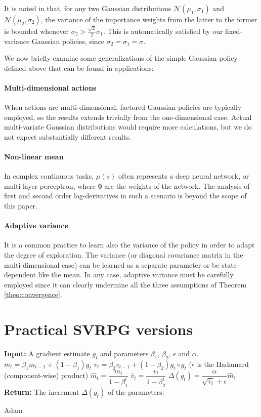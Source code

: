 \documentclass{article}
\theoremstyle{remark}
\theoremstyle{definition}
\newcommand{\vtheta}{\boldsymbol{\theta}}
\begin{document}
\varweights*
It is noted in \cite{cortes2010learning} that, for any two Gaussian distributions $\mathcal{N}(\mu_1,\sigma_1)$ and $\mathcal{N}(\mu_2,\sigma_2)$, the variance of the importance weights from the latter to the former is bounded whenever $\sigma_2 > \frac{\sqrt{2}}{2}\sigma_1$. This is automatically satisfied by our fixed-variance Gaussian policies, since $\sigma_2=\sigma_1=\sigma$.

We now briefly examine some generalizations of the simple Gaussian policy defined above that can be found in applications:

\paragraph{Multi-dimensional actions}
When actions are multi-dimensional, factored Gaussian policies are typically employed, so the results extends trivially from the one-dimensional case. Actual multi-variate Gaussian distributions would require more calculations, but we do not expect substantially different results.

\paragraph{Non-linear mean}
In complex continuous tasks, $\mu(s)$ often represents a deep neural network, or multi-layer perceptron, where $\vtheta$ are the weights of the network. The analysis of first and second order log-derivatives in such a scenario is beyond the scope of this paper.

\paragraph{Adaptive variance}
It is a common practice to learn also the variance of the policy in order to adapt the degree of exploration. The variance (or diagonal covariance matrix in the multi-dimensional case) can be learned as a separate parameter or be state-dependent like the mean. In any case, adaptive variance must be carefully employed since it can clearly undermine all the three assumptions of Theorem \ref{theo:convergence}.

\section{Practical SVRPG versions}\label{app:practicalsvrpg}
\begin{algorithm}[h]
        \begin{algorithmic}
        \STATE \textbf{Input:} A gradient estimate $g_t$ and parameters $\beta_1$, $\beta_2$, $\epsilon$ and $\alpha$.
        \STATE $m_t = \beta_1 m_{t-1} + (1 - \beta_1) g_t$
        \STATE $v_t = \beta_2 v_{t-1} + (1 - \beta_2) g_t \circ g_t$ ($\circ$ is the Hadamard (component-wise) product)
        \STATE $\hat{m}_t = \dfrac{m_t}{1 - \beta^t_1}$
        \STATE $\hat{v}_t = \dfrac{v_t}{1 - \beta^t_2}$
        \STATE $\Delta(g_t) = \dfrac{\alpha}{\sqrt{\hat{v}_t} + \epsilon} \hat{m}_t$
        \STATE \textbf{Return:} The increment $\Delta(g_t)$  of the parameters.
\end{algorithmic}
 \caption{
 \label{A:adam}
 Adam}
\end{algorithm}
\end{document}
